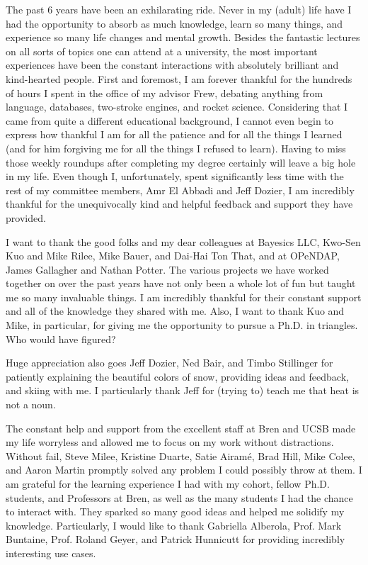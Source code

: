 \begin{acknowledgements}
The past 6 years have been an exhilarating ride. Never in my (adult) life have I had the opportunity to absorb as much knowledge, learn so many things, and experience so many life changes and mental growth.
Besides the fantastic lectures on all sorts of topics one can attend at a university, the most important experiences have been the constant interactions with absolutely brilliant and kind-hearted people. First and foremost, I am forever thankful for the hundreds of hours I spent in the office of my advisor Frew, debating anything from language, databases, two-stroke engines, and rocket science. Considering that I came from quite a different educational background, I cannot even begin to express how thankful I am for all the patience and for all the things I learned (and for him forgiving me for all the things I refused to learn). Having to miss those weekly roundups after completing my degree certainly will leave a big hole in my life. Even though I, unfortunately, spent significantly less time with the rest of my committee members, Amr El Abbadi and Jeff Dozier, I am incredibly thankful for the unequivocally kind and helpful feedback and support they have provided.

I want to thank the good folks and my dear colleagues at Bayesics LLC, Kwo-Sen Kuo and Mike Rilee, Mike Bauer, and Dai-Hai Ton That, and at OPeNDAP, James Gallagher and Nathan Potter. The various projects we have worked together on over the past years have not only been a whole lot of fun but taught me so many invaluable things. I am incredibly thankful for their constant support and all of the knowledge they shared with me. Also, I want to thank Kuo and Mike, in particular, for giving me the opportunity to pursue a Ph.D. in triangles. Who would have figured?

Huge appreciation also goes Jeff Dozier, Ned Bair, and Timbo Stillinger for patiently explaining the beautiful colors of snow, providing ideas and feedback, and skiing with me. I particularly thank Jeff for (trying to) teach me that heat is not a noun.

The constant help and support from the excellent staff at Bren and UCSB made my life worryless and allowed me to focus on my work without distractions. Without fail, Steve Milee, Kristine Duarte, Satie Airamé, Brad Hill, Mike Colee, and Aaron Martin promptly solved any problem I could possibly throw at them. I am grateful for the learning experience I had with my cohort, fellow Ph.D. students, and Professors at Bren, as well as the many students I had the chance to interact with. They sparked so many good ideas and helped me solidify my knowledge. Particularly, I would like to thank Gabriella Alberola, Prof. Mark Buntaine, Prof. Roland Geyer, and Patrick Hunnicutt for providing incredibly interesting use cases.


\end{acknowledgements}
